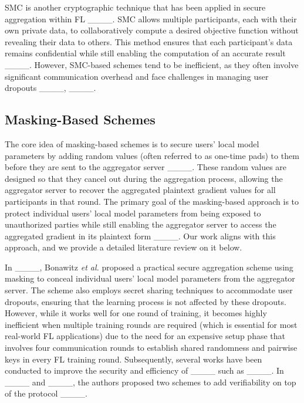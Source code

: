 \par 
SMC is another cryptographic technique that has been applied in secure aggregation within FL ____. SMC allows multiple participants, each with their own private data, to collaboratively compute a desired objective function without revealing their data to others. This method ensures that each participant’s data remains confidential while still enabling the computation of an accurate result ____. However, SMC-based schemes tend to be inefficient, as they often involve significant communication overhead and face challenges in managing user dropouts ____, ____.

\subsection{Masking-Based Schemes}
The core idea of masking-based schemes is to secure users' local model parameters by adding random values (often referred to as one-time pads) to them before they are sent to the aggregator server ____. These random values are designed so that they cancel out during the aggregation process, allowing the aggregator server to recover the aggregated plaintext gradient values for all participants in that round. The primary goal of the masking-based approach is to protect individual users' local model parameters from being exposed to unauthorized parties while still enabling the aggregator server to access the aggregated gradient in its plaintext form ____.  Our work aligns with this approach, and we provide a detailed literature review on it below. 
\par 
In ____, Bonawitz \emph{et al.} proposed a practical secure aggregation scheme using masking to conceal individual users' local model parameters from the aggregator server. The scheme also employs secret sharing techniques to accommodate user dropouts, ensuring that the learning process is not affected by these dropouts. However, while it works well for one round of training, it becomes highly inefficient when multiple training rounds are required (which is essential for most real-world FL applications) due to the need for an expensive setup phase that involves four communication rounds to establish shared randomness and pairwise keys in every FL training round. 
Subsequently, several works have been conducted to improve the security and efficiency of ____ such as ____. In ____ and ____, the authors proposed two schemes to add verifiability on top of the protocol ____. 
